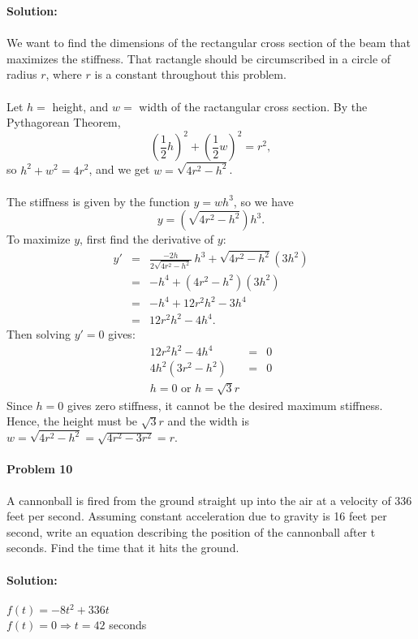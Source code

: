 \documentclass[a4paper,11pt]{article}
\begin{document}
\textbf{Solution: } \\ \\
We want to find the dimensions of the rectangular cross section of the beam that maximizes the stiffness.  That ractangle should be circumscribed in a circle of radius $r$, where $r$ is a constant throughout this problem.\\ \\
Let $h = $ height, and $w = $ width of the ractangular cross section.  By the Pythagorean Theorem, $$ \left( \frac{1}{2}h \right)^2 + \left( \frac{1}{2}w \right)^2 = r^2,$$ so $h^2 + w^2 = 4r^2$, and we get $w = \sqrt{4 r^2 - h^2}$. 
\\ \\
The stiffness is given by the function $y = w h^3$, so we have 
$$
y = (\sqrt{4 r^2 - h^2}) h^3.
$$
To maximize $y$, first find the derivative of $y$:
\begin{eqnarray*}
y' &=& \frac{-2h}{2\sqrt{4 r^2 - h^2}} ~ h^3 + \sqrt{4 r^2 - h^2} (3h^2) \\
&=& -h^4 +(4 r^2 - h^2)(3h^2) \\
&=& -h^4 + 12r^2 h^2 - 3h^4 \\
&=& 12r^2 h^2 - 4 h^4.
\end{eqnarray*}
Then solving $y'=0$ gives:
\begin{eqnarray*}
12r^2 h^2 - 4 h^4 &=& 0 \\
4 h^2 (3 r^2 - h^2) &=& 0 \\
h = 0 \mbox{~or~} h = \sqrt{3} r  
\end{eqnarray*}
Since $h=0$ gives zero stiffness, it cannot be the desired maximum stiffness.  Hence, the height must be $\sqrt{3} r$ and the width is $w = \sqrt{4 r^2 - h^2} = \sqrt{4 r^2 - 3 r^2} = r$.

\paragraph{Problem 10} A cannonball is fired from the ground straight up
into the air at a velocity of 336 feet per second.  Assuming constant
acceleration due to gravity is 16 feet per second, write an equation
describing the position of the cannonball after t seconds.  Find the time
that it hits the ground. \\ \\

\textbf{Solution: } \\ \\
$f(t) = -8t^2 + 336t$ \\
$f(t) = 0 \Rightarrow t = 42$ seconds
\end{document}
